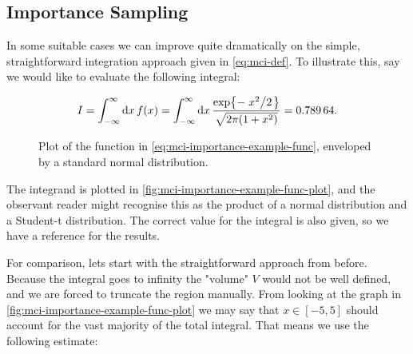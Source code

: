 \documentclass[Thesis.tex]{subfiles}
\begin{document}
\subsection{Importance Sampling}

In some suitable cases we can improve quite dramatically on the simple,
straightforward integration approach given in \cref{eq:mci-def}. To illustrate this, say we
would like to evaluate the following integral:

\begin{align}
    \label{eq:mci-importance-example-func}
    I = \intfy\dd{x}f(x)=\intfy\dd{x} \frac{\exp{-\flatfrac{x^2}{2} }}{\sqrt{2\pi \qty(1 +x^2)}}  = \num{0.78964}.
\end{align}

\begin{figure}
    \centering
    \caption[Illustration of example probability distributions]{\label{fig:mci-importance-example-func-plot}Plot of the function in
      \cref{eq:mci-importance-example-func}, enveloped by a standard normal distribution.}
\end{figure}
The integrand is plotted in \autoref{fig:mci-importance-example-func-plot}, and
the observant reader might recognise this as the product of a normal
distribution and a Student-t distribution. The correct value for the integral
is also given, so we have a reference for the results.

For comparison, lets start with the straightforward approach from before.
Because the integral goes to infinity the "volume" $V$ would not be well
defined, and we are forced to truncate the region manually. From looking at the
graph in \autoref{fig:mci-importance-example-func-plot} we may say that $x\in
[-5, 5]$ should account for the vast majority of the total integral. That means
we use the following estimate:
\end{document}
